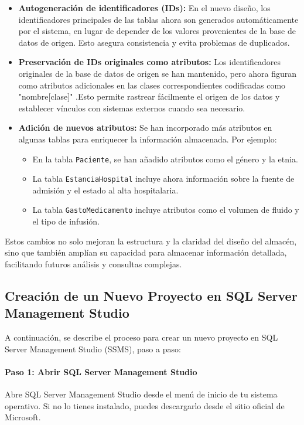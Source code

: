 \documentclass{article}
\begin{document}
\begin{itemize}
	\item \textbf{Autogeneración de identificadores (IDs):} En el nuevo diseño, los identificadores principales de las tablas ahora son generados automáticamente por el sistema, en lugar de depender de los valores provenientes de la base de datos de origen. Esto asegura consistencia y evita problemas de duplicados.
	
	\item \textbf{Preservación de IDs originales como atributos:} Los identificadores originales de la base de datos de origen se han mantenido, pero ahora figuran como atributos adicionales en las clases correspondientes codificadas como "nombre[clase]" .Esto permite rastrear fácilmente el origen de los datos y establecer vínculos con sistemas externos cuando sea necesario.
	
	\item \textbf{Adición de nuevos atributos:} Se han incorporado más atributos en algunas tablas para enriquecer la información almacenada. Por ejemplo:
	\begin{itemize}
		\item En la tabla \texttt{Paciente}, se han añadido atributos como el género y la etnia.
		\item La tabla \texttt{EstanciaHospital} incluye ahora información sobre la fuente de admisión y el estado al alta hospitalaria.
		\item La tabla \texttt{GastoMedicamento} incluye atributos como el volumen de fluido y el tipo de infusión.
	\end{itemize}
\end{itemize}

Estos cambios no solo mejoran la estructura y la claridad del diseño del almacén, sino que también amplían su capacidad para almacenar información detallada, facilitando futuros análisis y consultas complejas.


\subsection{Creación de un Nuevo Proyecto en SQL Server Management Studio}

A continuación, se describe el proceso para crear un nuevo proyecto en SQL Server Management Studio (SSMS), paso a paso:

\paragraph{Paso 1: Abrir SQL Server Management Studio}  
Abre SQL Server Management Studio desde el menú de inicio de tu sistema operativo. Si no lo tienes instalado, puedes descargarlo desde el sitio oficial de Microsoft.
\end{document}
